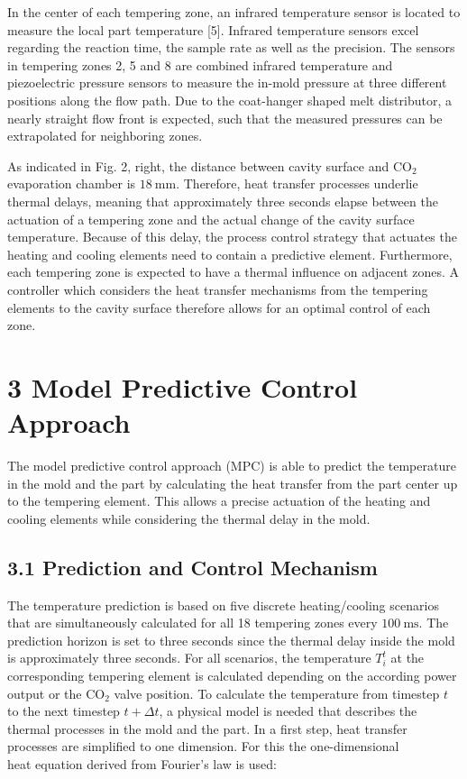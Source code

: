 \documentclass[10pt]{article}
\begin{document}
In the center of each tempering zone, an infrared temperature sensor is located to measure the local part temperature [5]. Infrared temperature sensors excel regarding the reaction time, the sample rate as well as the precision. The sensors in tempering zones 2, 5 and 8 are combined infrared temperature and piezoelectric pressure sensors to measure the in-mold pressure at three different positions along the flow path. Due to the coat-hanger shaped melt distributor, a nearly straight flow front is expected, such that the measured pressures can be extrapolated for neighboring zones.

As indicated in Fig. 2, right, the distance between cavity surface and $\mathrm{CO}_{2}$ evaporation chamber is $18 \mathrm{~mm}$. Therefore, heat transfer processes underlie thermal delays, meaning that approximately three seconds elapse between the actuation of a tempering zone and the actual change of the cavity surface temperature. Because of this delay, the process control strategy that actuates the heating and cooling elements need to contain a predictive element. Furthermore, each tempering zone is expected to have a thermal influence on adjacent zones. A controller which considers the heat transfer mechanisms from the tempering elements to the cavity surface therefore allows for an optimal control of each zone.

\section*{3 Model Predictive Control Approach}
The model predictive control approach (MPC) is able to predict the temperature in the mold and the part by calculating the heat transfer from the part center up to the tempering element. This allows a precise actuation of the heating and cooling elements while considering the thermal delay in the mold.

\subsection*{3.1 Prediction and Control Mechanism}
The temperature prediction is based on five discrete heating/cooling scenarios that are simultaneously calculated for all 18 tempering zones every $100 \mathrm{~ms}$. The prediction horizon is set to three seconds since the thermal delay inside the mold is approximately three seconds. For all scenarios, the temperature $T_{i}^{t}$ at the corresponding tempering element is calculated depending on the according power output or the $\mathrm{CO}_{2}$ valve position. To calculate the temperature from timestep $t$ to the next timestep $t+\Delta t$, a physical model is needed that describes the thermal processes in the mold and the part. In a first step, heat transfer processes are simplified to one dimension. For this the one-dimensional\\
heat equation derived from Fourier's law is used:
\end{document}
